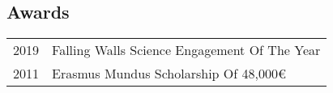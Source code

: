 \subsection{Awards}
\begin{longtable}
	{r|p{13cm}}
	\textsc{2019} & Falling Walls Science Engagement Of The Year\\
	\textsc{2011} & Erasmus Mundus Scholarship Of 48,000€\\
\end{longtable}
